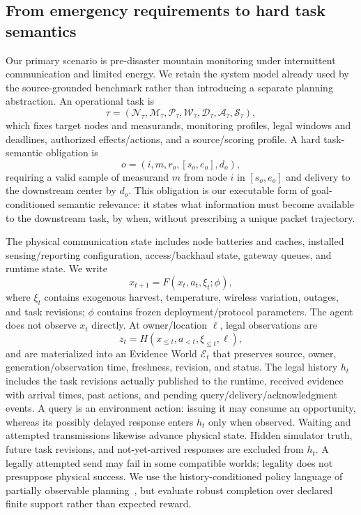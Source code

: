 \documentclass[conference]{IEEEtran}
\newcommand{\Evi}{\mathcal{E}}
\begin{document}
\subsection{From emergency requirements to hard task semantics}
Our primary scenario is pre-disaster mountain monitoring under intermittent communication and limited energy. We retain the system model already used by the source-grounded benchmark rather than introducing a separate planning abstraction. An operational task is
\begin{equation}
\tau=(\mathcal N_\tau,\mathcal M_\tau,\mathcal P_\tau,\mathcal W_\tau,
\mathcal D_\tau,\mathcal A_\tau,\mathcal S_\tau),
\end{equation}
which fixes target nodes and measurands, monitoring profiles, legal windows and deadlines, authorized effects/actions, and a source/scoring profile. A hard task-semantic obligation is
\begin{equation}
o=(i,m,r_o,[s_o,e_o],d_o),
\end{equation}
requiring a valid sample of measurand $m$ from node $i$ in $[s_o,e_o]$ and delivery to the downstream center by $d_o$. This obligation is our executable form of goal-conditioned semantic relevance: it states what information must become available to the downstream task, by when, without prescribing a unique packet trajectory.

The physical communication state includes node batteries and caches, installed sensing/reporting configuration, access/backhaul state, gateway queues, and runtime state. We write
\begin{equation}
x_{t+1}=F(x_t,a_t,\xi_t;\phi),
\end{equation}
where $\xi_t$ contains exogenous harvest, temperature, wireless variation, outages, and task revisions; $\phi$ contains frozen deployment/protocol parameters. The agent does not observe $x_t$ directly. At owner/location $\ell$, legal observations are
\begin{equation}
z_t=H(x_{\le t},a_{<t},\xi_{\le t},\ell),
\end{equation}
and are materialized into an Evidence World $\Evi_t$ that preserves source, owner, generation/observation time, freshness, revision, and status. The legal history $h_t$ includes the task revisions actually published to the runtime, received evidence with arrival times, past actions, and pending query/delivery/acknowledgment events. A query is an environment action: issuing it may consume an opportunity, whereas its possibly delayed response enters $h_t$ only when observed. Waiting and attempted transmissions likewise advance physical state. Hidden simulator truth, future task revisions, and not-yet-arrived responses are excluded from $h_t$. A legally attempted send may fail in some compatible worlds; legality does not presuppose physical success. We use the history-conditioned policy language of partially observable planning~\cite{kaelbling1998pomdp}, but evaluate robust completion over declared finite support rather than expected reward.
\end{document}
